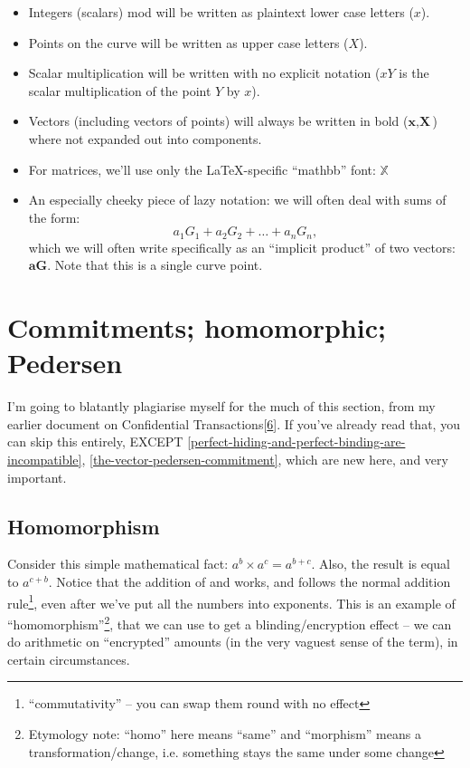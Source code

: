 \documentclass[10pt,a4paper]{article}
\providecommand{\tightlist}{%
  \setlength{\itemsep}{0pt}\setlength{\parskip}{0pt}}
\begin{document}
\begin{itemize}
\tightlist
\item
  Integers (scalars) mod will be written as plaintext lower case letters
  ($x$).
\item
  Points on the curve will be written as upper case letters ($X$).
\item
  Scalar multiplication will be written with no explicit notation ($xY$ is
  the scalar multiplication of the point $Y$ by $x$).
\item
  Vectors (including vectors of points) will always be written in bold ($\textbf{x}, \textbf{X}$)
  where not expanded out into components.
\item
  For matrices, we'll use only the LaTeX-specific ``mathbb'' font: $\mathbb{X}$
\item
  An especially cheeky piece of lazy notation: we will often deal with
  sums of the form:
  \[a_1G_1 + a_2G_2 + \ldots + a_nG_n, \]
which we will often write specifically as an ``implicit product'' of
two vectors: $\textbf{aG}$. Note that this is a single curve point.
\end{itemize}
\hypertarget{commitments-homomorphic-pedersen}{%
\section[Commitments; homomorphic;
Pedersen]{\texorpdfstring{\protect\hypertarget{anchor-12}{}{}Commitments;
homomorphic;
Pedersen}{Commitments; homomorphic; Pedersen}}\label{commitments-homomorphic-pedersen}}

I'm going to blatantly plagiarise myself for the much of this section,
from my earlier document on Confidential
Transactions{[}\protect\hyperlink{anchor-3}{6}{]}. If you've already
read that, you can skip this entirely, 
EXCEPT \ref{perfect-hiding-and-perfect-binding-are-incompatible}, 
\ref{the-vector-pedersen-commitment}, which are new here, and very important.

\hypertarget{homomorphism}{%
\subsection[Homomorphism]{\texorpdfstring{\protect\hypertarget{anchor-13}{}{}Homomorphism}{Homomorphism}}\label{homomorphism}}

Consider this simple mathematical fact: $a^b \times a^c = a^{b+c}$. Also, the result is equal to $a^{c+b}$.
Notice that the addition of and works, and follows the normal addition
rule\footnote{``commutativity'' -- you can swap them round with no effect}, even
after we've put all the numbers into exponents. This is an example of
``homomorphism''\footnote{Etymology note: ``homo'' here means ``same'' and
``morphism'' means a transformation/change, i.e. something stays the
same under some change}, that we can use to get a blinding/encryption
effect -- we can do arithmetic on ``encrypted'' amounts (in the very
vaguest sense of the term), in certain circumstances.
\end{document}
